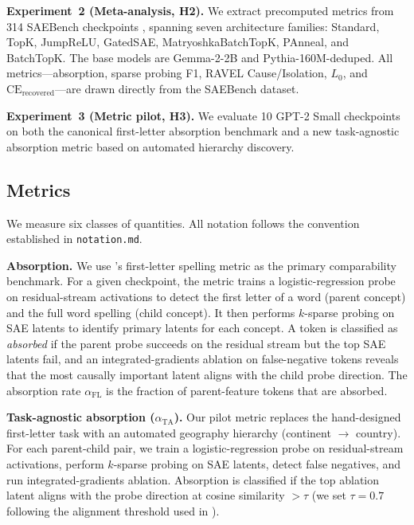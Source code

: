 \documentclass{article}
\begin{document}
\textbf{Experiment~2 (Meta-analysis, H2).} We extract precomputed metrics from 314 SAEBench checkpoints \citep{adamkarvonen2025}, spanning seven architecture families: Standard, TopK, JumpReLU, GatedSAE, MatryoshkaBatchTopK, PAnneal, and BatchTopK. The base models are Gemma-2-2B and Pythia-160M-deduped. All metrics---absorption, sparse probing F1, RAVEL Cause/Isolation, $L_0$, and $\text{CE}_{\text{recovered}}$---are drawn directly from the SAEBench dataset.

\textbf{Experiment~3 (Metric pilot, H3).} We evaluate 10 GPT-2 Small checkpoints on both the canonical first-letter absorption benchmark and a new task-agnostic absorption metric based on automated hierarchy discovery.

\subsection{Metrics}
\label{sec:metrics}

We measure six classes of quantities. All notation follows the convention established in \texttt{notation.md}.

\textbf{Absorption.} We use \citeauthor{chanin2024absorption}'s first-letter spelling metric as the primary comparability benchmark. For a given checkpoint, the metric trains a logistic-regression probe on residual-stream activations to detect the first letter of a word (parent concept) and the full word spelling (child concept). It then performs $k$-sparse probing on SAE latents to identify primary latents for each concept. A token is classified as \emph{absorbed} if the parent probe succeeds on the residual stream but the top SAE latents fail, and an integrated-gradients ablation on false-negative tokens reveals that the most causally important latent aligns with the child probe direction. The absorption rate $\alpha_{\text{FL}}$ is the fraction of parent-feature tokens that are absorbed.

\textbf{Task-agnostic absorption ($\alpha_{\text{TA}}$).} Our pilot metric replaces the hand-designed first-letter task with an automated geography hierarchy (continent $\to$ country). For each parent-child pair, we train a logistic-regression probe on residual-stream activations, perform $k$-sparse probing on SAE latents, detect false negatives, and run integrated-gradients ablation. Absorption is classified if the top ablation latent aligns with the probe direction at cosine similarity $> \tau$ (we set $\tau = 0.7$ following the alignment threshold used in \citealp{chanin2024absorption}).
\end{document}
